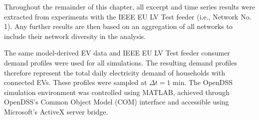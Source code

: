 


Throughout the remainder of this chapter, all excerpt and time series results were extracted from experiments with the IEEE EU LV Test feeder (i.e., Network No. 1).
Any further results are then based on an aggregation of all networks to include their network diversity in the analysis.

The same model-derived EV data and IEEE EU LV Test feeder consumer demand profiles were used for all simulations.
The resulting demand profiles therefore represent the total daily electricity demand of households with connected EVs.
These profiles were sampled at $\Delta t = 1\text{ min}$.
The OpenDSS simulation environment was controlled using MATLAB, achieved through OpenDSS's Common Object Model (COM) interface and accessible using Microsoft's ActiveX server bridge.


